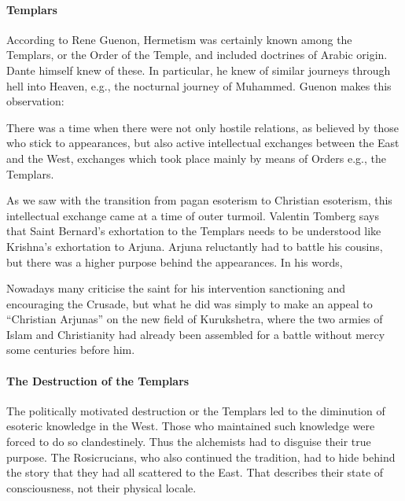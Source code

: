 \paragraph{Templars}


According to Rene Guenon, Hermetism was certainly known among the Templars, or the Order of the Temple, and included doctrines of Arabic origin. Dante himself knew of these. In particular, he knew of similar journeys through hell into Heaven, e.g., the nocturnal journey of Muhammed. Guenon makes this observation:

\begin{quotex}
There was a time when there were not only hostile relations, as believed by those who stick to appearances, but also active intellectual exchanges between the East and the West, exchanges which took place mainly by means of Orders e.g., the Templars.
\end{quotex}


As we saw with the transition from pagan esoterism to Christian esoterism, this intellectual exchange came at a time of outer turmoil. Valentin Tomberg says that Saint Bernard's exhortation to the Templars needs to be understood like Krishna's exhortation to Arjuna. Arjuna reluctantly had to battle his cousins, but there was a higher purpose behind the appearances. In his words,

\begin{quotex}
Nowadays many criticise the saint for his intervention sanctioning and encouraging the Crusade, but what he did was simply to make an appeal to ``Christian Arjunas'' on the new field of Kurukshetra, where the two armies of Islam and Christianity had already been assembled for a battle without mercy some centuries before him.
\end{quotex}


\paragraph{The Destruction of the Templars}


The politically motivated destruction or the Templars led to the diminution of esoteric knowledge in the West. Those who maintained such knowledge were forced to do so clandestinely. Thus the alchemists had to disguise their true purpose. The Rosicrucians, who also continued the tradition, had to hide behind the story that they had all scattered to the East. That describes their state of consciousness, not their physical locale.

